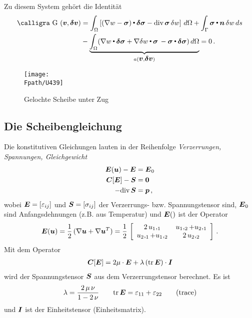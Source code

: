 Zu diesem System geh\"{o}rt die Identit\"{a}t
\begin{align}
 \text{\normalfont\calligra G\,\,}(\vek v,\vek  \delta \vek v) &= \int_{\Omega} \left[(\nabla w - \vek \sigma) \dotprod \vek \delta \vek \sigma - \text{div} \,\vek \sigma\, \delta w\right]\,d\Omega
+ \int_{\Gamma} \vek \sigma \dotprod \vek n\,\delta w\,ds \nn \\
&- \underbrace{\int_{\Omega} (\nabla w \dotprod \vek  \delta \vek \sigma + \nabla \delta w \dotprod \vek \sigma\,- \vek \sigma \dotprod \vek  \delta \vek \sigma) \,d\Omega}_{a(\vek v, \vek  \delta \vek v)} = 0\,.
\end{align}

\begin{figure}[tbp] %
\centering
\if {} \sidecaption \fi
\texttt{[image: \\Fpath/U439]}
\caption{Gelochte Scheibe unter Zug} \label{U439}
%
\end{figure}%

\textcolor{sectionTitleBlue}{\section{Die Scheibengleichung}}
Die konstitutiven Gleichungen lauten in der Reihenfolge {\em Verzerrungen, Spannungen, Gleichgewicht\/}
\begin{subequations}\label{Eq54}
\begin{align}
\mbox{\boldmath $E$}(\mbox{\boldmath $u$}) - \mbox{\boldmath $E$} &= \mbox{\boldmath $E$}_0 \\
\mbox{\boldmath $C$}[\mbox{\boldmath $E$}] - \mbox{\boldmath $S$} &= \mbox{\boldmath $0$} \\
- \text{div}\,\mbox{\boldmath $S$} &= \mbox{\boldmath $p$}\,,
\end{align}
\end{subequations}
wobei $\mbox{\boldmath $E$} = [\varepsilon_{ij}]$ und $\mbox{\boldmath $S$} = [\sigma_{ij}]$ der Verzerrungs- bzw. Spannungstensor sind, $\mbox{\boldmath $E$}_0$ sind Anfangsdehnungen (z.B. aus Temperatur) und $\mbox{\boldmath $E$}()$ ist der Operator
\begin{align}\label{Eq48}
\vek E(\vek u) = \frac{1}{2}\,(\nabla \vek u + \nabla \vek u^T) = \frac{1}{2}\,\left[ \barr {c @{\hspace{4mm}}c }
      2 \,u_1,_1 & u_1,_2 + u_2,_1\\
      u_2,_1 + u_1,_2 & 2\,u_2,_2
    \earr \right]\,.
\end{align}
Mit dem Operator
\begin{align}\label{Eq60}
\mbox{\boldmath $C$}[\mbox{\boldmath $E$}] = 2\mu\cdot\mbox{\boldmath $E$} + \lambda\,(\text{tr}\,\mbox{\boldmath $E$})\cdot\mbox{\boldmath $I$}
\end{align}
wird der Spannungstensor $\mbox{\boldmath $S$}$ aus dem Verzerrungstensor berechnet. Es ist
\begin{align}
\lambda = \frac{2\,\mu\,\nu}{1 - 2\,\nu} \qquad \text{tr}\,\mbox{\boldmath $E$} = \varepsilon_{11} + \varepsilon_{22} \qquad \text{(trace)}
\end{align}
und $\mbox{\boldmath $I$}$ ist der Einheitstensor  (Einheitsmatrix).

